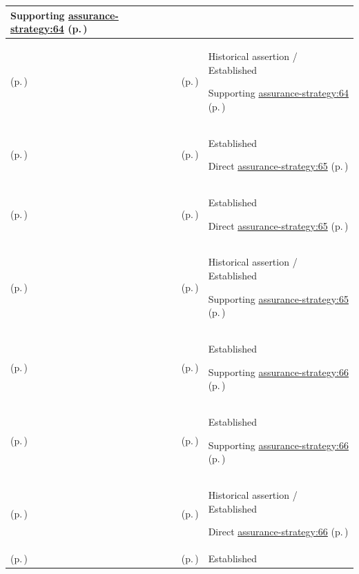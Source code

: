 \begin{longtable}{|>{\raggedright\arraybackslash}p{0.27\TableWidth}|>{\raggedright\arraybackslash}p{0.27\TableWidth}|>{\raggedright\arraybackslash}p{0.46\TableWidth}|}
Supporting \hyperref[rad:assurance-strategy:58]{assurance-strategy:64} (p.\,\pageref{rad:assurance-strategy:58})\\\hline
\nameref{cap:bec-governed-assurance} (p.\,\pageref{cap:bec-governed-assurance}) & \nameref{cap:ec-05} (p.\,\pageref{cap:ec-05}) & Historical assertion / Established

Supporting \hyperref[rad:assurance-strategy:58]{assurance-strategy:64} (p.\,\pageref{rad:assurance-strategy:58})\\\hline
\nameref{cap:bec-assurance-design} (p.\,\pageref{cap:bec-assurance-design}) & \nameref{cap:ec-06} (p.\,\pageref{cap:ec-06}) & Established

Direct \hyperref[rad:assurance-strategy:58]{assurance-strategy:65} (p.\,\pageref{rad:assurance-strategy:58})\\\hline
\nameref{cap:bec-assurance-criteria-management} (p.\,\pageref{cap:bec-assurance-criteria-management}) & \nameref{cap:ec-06} (p.\,\pageref{cap:ec-06}) & Established

Direct \hyperref[rad:assurance-strategy:58]{assurance-strategy:65} (p.\,\pageref{rad:assurance-strategy:58})\\\hline
\nameref{cap:bec-governed-assurance} (p.\,\pageref{cap:bec-governed-assurance}) & \nameref{cap:ec-06} (p.\,\pageref{cap:ec-06}) & Historical assertion / Established

Supporting \hyperref[rad:assurance-strategy:58]{assurance-strategy:65} (p.\,\pageref{rad:assurance-strategy:58})\\\hline
\nameref{cap:bec-assurance-design} (p.\,\pageref{cap:bec-assurance-design}) & \nameref{cap:ec-07} (p.\,\pageref{cap:ec-07}) & Established

Supporting \hyperref[rad:assurance-strategy:58]{assurance-strategy:66} (p.\,\pageref{rad:assurance-strategy:58})\\\hline
\nameref{cap:bec-assurance-criteria-management} (p.\,\pageref{cap:bec-assurance-criteria-management}) & \nameref{cap:ec-07} (p.\,\pageref{cap:ec-07}) & Established

Supporting \hyperref[rad:assurance-strategy:58]{assurance-strategy:66} (p.\,\pageref{rad:assurance-strategy:58})\\\hline
\nameref{cap:bec-governed-assurance} (p.\,\pageref{cap:bec-governed-assurance}) & \nameref{cap:ec-07} (p.\,\pageref{cap:ec-07}) & Historical assertion / Established

Direct \hyperref[rad:assurance-strategy:58]{assurance-strategy:66} (p.\,\pageref{rad:assurance-strategy:58})\\\hline
\nameref{cap:bec-assurance-criteria-management} (p.\,\pageref{cap:bec-assurance-criteria-management}) & \nameref{cap:ec-08} (p.\,\pageref{cap:ec-08}) & Established


\end{longtable}

